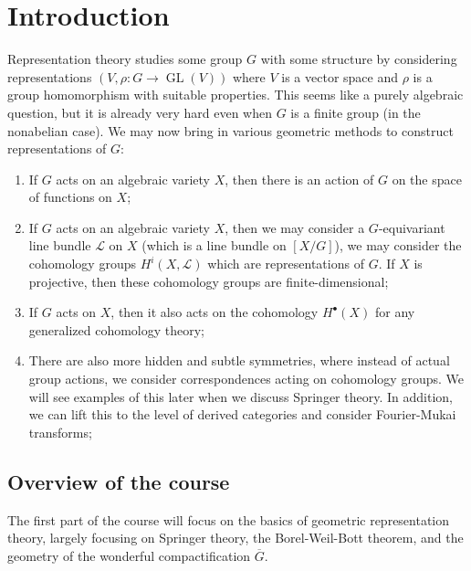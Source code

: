 \documentclass{amsart}
\theoremstyle{definition}
\theoremstyle{remark}
\theoremstyle{plain}
\theoremstyle{definition}
\theoremstyle{remark}
\newcommand{\mc}[1]{\mathcal{#1}}
\newcommand{\on}[1]{\operatorname{#1}}
\newcommand{\ol}[1]{\overline{#1}}
\newcommand{\1}{\mathbf{1}}
\newcommand{\2}{\mathbf{2}}
\newcommand{\3}{\mathbf{3}}
\begin{document}
\maketitle

\tableofcontents

\section{Introduction}%
\label{sec:introduction}

Representation theory studies some group \(G\) with some structure by considering representations \((V,\rho \colon G \to \on{GL}(V))\) where \(V\) is a vector space and \(\rho\) is a group homomorphism with suitable properties. This seems like a purely algebraic question, but it is already very hard even when \(G\) is a finite group (in the nonabelian case). We may now bring in various geometric methods to construct representations of \(G\):
\begin{enumerate}
    \item If \(G\) acts on an algebraic variety \(X\), then there is an action of \(G\) on the space of functions on \(X\);
    \item If \(G\) acts on an algebraic variety \(X\), then we may consider a \(G\)-equivariant line bundle \(\mc{L}\) on \(X\) (which is a line bundle on \([X/G]\)), we may consider the cohomology groups \(H^i(X,\mc{L})\) which are representations of \(G\). If \(X\) is projective, then these cohomology groups are finite-dimensional;
    \item If \(G\) acts on \(X\), then it also acts on the cohomology \(H^{\bullet}(X) \)  for any generalized cohomology theory;
    \item There are also more hidden and subtle symmetries, where instead of actual group actions, we consider correspondences acting on cohomology groups. We will see examples of this later when we discuss Springer theory. In addition, we can lift this to the level of derived categories and consider Fourier-Mukai transforms;
\end{enumerate}

\subsection{Overview of the course}%
\label{sub:Overview of the course}


The first part of the course will focus on the basics of geometric representation theory, largely focusing on Springer theory, the Borel-Weil-Bott theorem, and the geometry of the wonderful compactification \(\ol{G}\).
\end{document}
